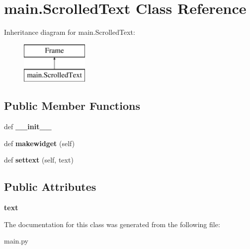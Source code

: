 \hypertarget{classmain_1_1_scrolled_text}{}\section{main.\+Scrolled\+Text Class Reference}
\label{classmain_1_1_scrolled_text}
Inheritance diagram for main.\+Scrolled\+Text\+:\begin{figure}[H]
\begin{center}
\leavevmode
\includegraphics[height=2.000000cm]{classmain_1_1_scrolled_text}
\end{center}
\end{figure}
\subsection*{Public Member Functions}
\begin{DoxyCompactItemize}
\item 
\hypertarget{classmain_1_1_scrolled_text_a8dfda3dc2fe3ea57617aeb2dd3d7b6d5}{}def {\bfseries \+\_\+\+\_\+init\+\_\+\+\_\+}\label{classmain_1_1_scrolled_text_a8dfda3dc2fe3ea57617aeb2dd3d7b6d5}

\item 
\hypertarget{classmain_1_1_scrolled_text_a02b3adc55ed2f9c02b02afb7b9af7a2e}{}def {\bfseries makewidget} (self)\label{classmain_1_1_scrolled_text_a02b3adc55ed2f9c02b02afb7b9af7a2e}

\item 
\hypertarget{classmain_1_1_scrolled_text_a1f22f42049dc1afbca6b94b7f341788a}{}def {\bfseries settext} (self, text)\label{classmain_1_1_scrolled_text_a1f22f42049dc1afbca6b94b7f341788a}

\end{DoxyCompactItemize}
\subsection*{Public Attributes}
\begin{DoxyCompactItemize}
\item 
\hypertarget{classmain_1_1_scrolled_text_a64205b5ecc73fc73038b86d7058cade7}{}{\bfseries text}\label{classmain_1_1_scrolled_text_a64205b5ecc73fc73038b86d7058cade7}

\end{DoxyCompactItemize}


The documentation for this class was generated from the following file\+:\begin{DoxyCompactItemize}
\item 
main.\+py\end{DoxyCompactItemize}
